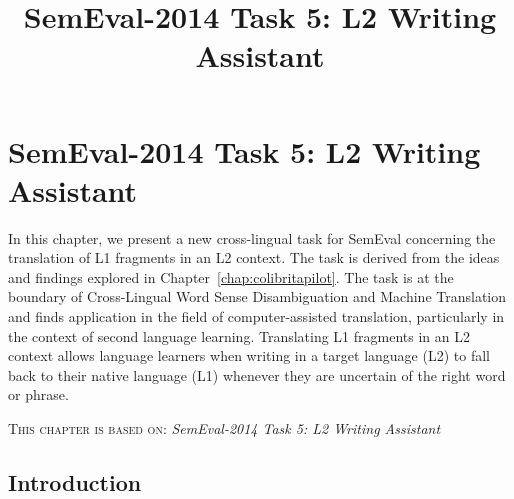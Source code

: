 \newcommand{\wsname}{SemEval-2014}
\newcommand{\submissionpage}{\url{http://alt.qcri.org/semeval2014/index.php?id=cfp}}
\newcommand{\filename}{semeval2014}
\newcommand{\contact}{pnakov qf.org.qa}

\title{SemEval-2014 Task 5: L2 Writing Assistant}
\chapter{SemEval-2014 Task 5: L2 Writing Assistant}

\label{chap:semeval2014task5}


In this chapter, we present a new cross-lingual task for SemEval concerning the
translation of L1 fragments in an L2 context. The task is derived from the
ideas and findings explored in Chapter~\ref{chap:colibritapilot}.  The task is
at the boundary of Cross-Lingual Word Sense Disambiguation and Machine
Translation and finds application in the field of computer-assisted
translation, particularly in the context of second language learning.
Translating L1 fragments in an L2 context allows language learners when writing
in a target language (L2) to fall back to their native language (L1) whenever
they are uncertain of the right word or phrase.

\textsc{This chapter is based on: } \emph{SemEval-2014 Task 5: L2 Writing Assistant}

\section{Introduction} %

